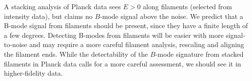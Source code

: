 

A stacking analysis of Planck data \citep{2016A&A...586A.141P} sees $E>0$ along filaments (selected from intensity data), but claims no $B$-mode signal above the noise. We predict that a B-mode signal from filaments should be present, since they have a finite length of a few degrees.  Detecting B-modes from filaments will be easier with more signal-to-noise and may require a more careful filament analysis, rescaling and aligning the filament ends.  While the detectability of the $B$-mode signature from stacked filaments in Planck data calls for a more careful assessment, we should see it in higher-fidelity data.

 

